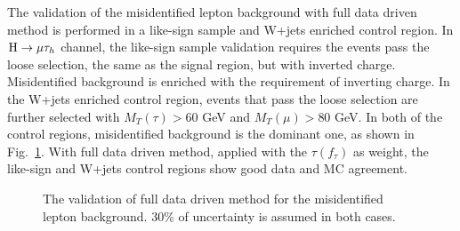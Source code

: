 \documentclass[final,numrefs,sort&compress,twoadvisors]{nddiss2e}
\begin{document}
The validation of the misidentified lepton background with full data driven method is performed in a like-sign sample and W+jets enriched control region. In $\mathrm{H}\to \mu\tau_{h}$ channel, the like-sign sample validation requires the events pass the loose selection, the same as the signal region, but with inverted charge. Misidentified background is enriched with the requirement of inverting charge. In the W+jets enriched control region, events that pass the loose selection are further selected with  $M_T(\tau)>60$ GeV and $M_T(\mu)>80$ GeV.  In both of the control regions, misidentified background is the dominant one, as shown in Fig.~\ref{fig:fakebackgroundValidation}. With full data driven method, applied with the $\tau(f_{\tau})$ as weight, the like-sign and W+jets control regions show good data and MC agreement. 


\begin{figure}[htbp] 
     \centering
     \caption{The validation of full data driven method for the misidentified lepton background. 30\% of uncertainty is assumed in both cases. }
     \label{fig:fakebackgroundValidation}
\end{figure}
\end{document}

